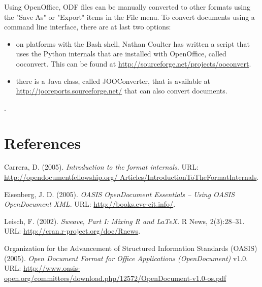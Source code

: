 \documentclass[12pt]{article}
\begin{document}
Using OpenOffice, ODF files can be manually converted to other formats using the  "Save As" or "Export" items in the File menu. To convert documents using a command line interface, there are at last two options:
\begin{itemize}
\item on platforms with the Bash shell, Nathan Coulter has written a script that uses the Python internals that are installed with OpenOffice, called ooconvert. This can be found at \linebreak \href{http://sourceforge.net/projects/ooconvert} {http://sourceforge.net/projects/ooconvert}.
\item there is a Java class, called  JOOConverter, that is available at \href{http://jooreports.sourceforge.net/} {http://jooreports.sourceforge.net/} that can also convert documents.
\end{itemize}.



\section{References}

\begin{description}
\item Carrera, D. (2005). {\em Introduction to the format internals}.  URL:   \href{http://opendocumentfellowship.org/Articles/IntroductionToTheFormatInternals} {http://opendocumentfellowship.org/ Articles/IntroductionToTheFormatInternals}.

\item Eisenberg, J. D. (2005). {\em OASIS OpenDocument Essentials -- Using OASIS OpenDocument XML}. URL: \href{http://books.evc-cit.info/} {http://books.evc-cit.info/}.

\item Leisch, F. (2002). {\em Sweave, Part I: Mixing R and \LaTeX{}}. R News, 2(3):28--31. URL: \href{http://cran.r-project.org/doc/Rnews} {http://cran.r-project.org/doc/Rnews}.

\item Organization for the Advancement of Structured Information Standards (OASIS) (2005). {\em Open Document Format for Office Applications (OpenDocument)} v1.0. URL: \href{http://www.oasis-open.org/committees/download.php/12572/OpenDocument-v1.0-os.pdf} {http://www.oasis-open.org/committees/download.php/12572/OpenDocument-v1.0-os.pdf}

\end{description}
\end{document}
